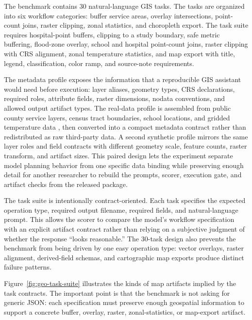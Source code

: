 \documentclass[12pt]{gsis}  %
\begin{document}
The benchmark contains 30 natural-language GIS tasks. The tasks are organized into six workflow categories: buffer service areas, overlay intersections, point-count joins, raster clipping, zonal statistics, and choropleth export. The task suite requires hospital-point buffers, clipping to a study boundary, safe metric buffering, flood-zone overlay, school and hospital point-count joins, raster clipping with CRS alignment, zonal temperature statistics, and map export with title, legend, classification, color ramp, and source-note requirements.

The metadata profile exposes the information that a reproducible GIS assistant would need before execution: layer aliases, geometry types, CRS declarations, required roles, attribute fields, raster dimensions, nodata conventions, and allowed output artifact types. The real-data profile is assembled from public county service layers, census tract boundaries, school locations, and gridded temperature data \citep{LACountyGIS_Hospitals,LACountyDPW_FloodZones,USCensus_TIGER2025,NCES_EDGE_2425,WorldClim_21}, then converted into a compact metadata contract rather than redistributed as raw third-party data. A second synthetic profile mirrors the same layer roles and field contracts with different geometry scale, feature counts, raster transform, and artifact sizes. This paired design lets the experiment separate model planning behavior from one specific data binding while preserving enough detail for another researcher to rebuild the prompts, scorer, execution gate, and artifact checks from the released package.

The task suite is intentionally contract-oriented. Each task specifies the expected operation type, required output filename, required fields, and natural-language prompt. This allows the scorer to compare the model's workflow specification with an explicit artifact contract rather than relying on a subjective judgment of whether the response ``looks reasonable.'' The 30-task design also prevents the benchmark from being driven by one easy operation type: vector overlays, raster alignment, derived-field schemas, and cartographic map exports produce distinct failure patterns.

Figure~\ref{fig:geo-task-suite} illustrates the kinds of map artifacts implied by the task contracts. The important point is that the benchmark is not asking for generic JSON: each specification must preserve enough geospatial information to support a concrete buffer, overlay, raster, zonal-statistics, or map-export artifact.
\end{document}
